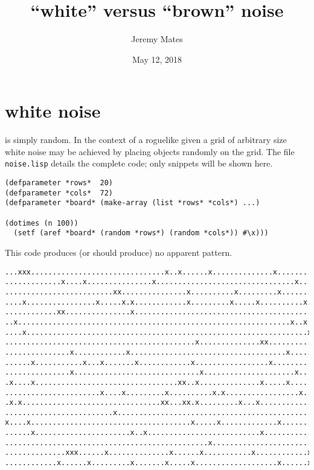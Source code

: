 \documentclass[12pt,a4paper]{article}
\title{``white'' versus ``brown'' noise}
\author{Jeremy Mates}
\date{May 12, 2018}
\begin{document}
\maketitle

\setlength{\parindent}{0pt}

\section*{white noise}

is simply random. In the context of a roguelike given a grid of
arbitrary size white noise may be achieved by placing objects randomly
on the grid. The file \texttt{noise.lisp} details the complete code;
only snippets will be shown here.

\begin{verbatim}
(defparameter *rows*  20)
(defparameter *cols*  72)
(defparameter *board* (make-array (list *rows* *cols*) ...)

(dotimes (n 100))
  (setf (aref *board* (random *rows*) (random *cols*)) #\x)))
\end{verbatim}

This code produces (or should produce) no apparent pattern.

\begin{verbatim}
...xxx...............................x..x......x..............x.........
.............x....x...............x................................x....
.........................xx...............x..........x.........x........
....x................x.....x.x............x.........x.....x..........x..
............xx...............x..........................................
..x...............................................................x..x..
....x.................................................................x.
............................................x..............xx...........
...............x............x....................................x......
......x...........x...x.......x............x.................x..........
...............x.............................x.....................x....
.x....x.................................xx..x..............x.....x......
......................x....x.........x..........x.x.................x...
.x.x................................xx...xx.x.........x...x.............
.........................x..............................................
x....x.....................................x.....x.............x........
......x......................x..x..........................x............
...............................................x........................
..............xxx......x..............x......x...........x............x.
............x......x.........x.......x.....x...................x......x.
\end{verbatim}
\end{document}
